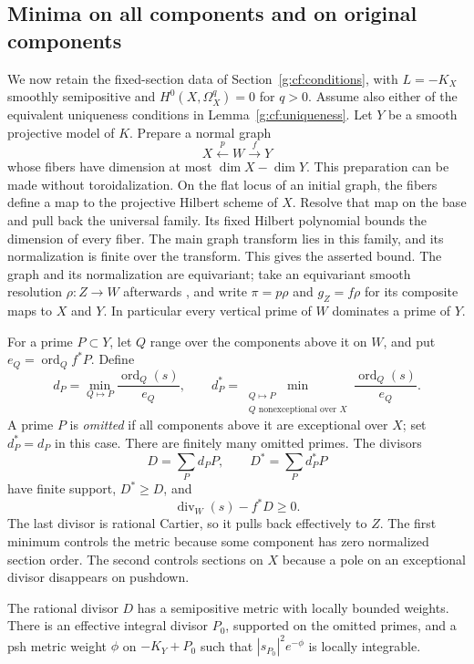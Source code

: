 \subsection{Minima on all components and on original components}
\label{g:cf:minima}

We now retain the fixed-section data of
Section~\ref{g:cf:conditions}, with $L=-K_X$ smoothly semipositive and
$H^0(X,\Omega_X^q)=0$ for $q>0$. Assume also either of the equivalent
uniqueness conditions in Lemma~\ref{g:cf:uniqueness}. Let $Y$ be a smooth projective model
of $K$. Prepare a normal graph
\[
 X\xleftarrow{p}W\xrightarrow{f}Y
\]
whose fibers have dimension at most $\dim X-\dim Y$.
This preparation can be made without toroidalization. On the flat locus
of an initial graph, the fibers define a map to the projective Hilbert
scheme of $X$. Resolve that map on the base and pull back the universal
family. Its fixed Hilbert polynomial bounds the dimension of every fiber.
The main graph transform lies in this family, and its normalization is
finite over the transform. This gives the asserted bound. The graph and
its normalization are equivariant; take an equivariant
smooth resolution $\rho:Z\to W$ afterwards
\cite{RaynaudGruson1971}, and write $\pi=p\rho$ and $g_Z=f\rho$ for
its composite maps to $X$ and $Y$. In particular every vertical
prime of $W$ dominates a prime of $Y$.

For a prime $P\subset Y$, let $Q$ range over the components above it on
$W$, and put $e_Q=\operatorname{ord}_Q f^*P$. Define
\[
 d_P=\min_{Q\mapsto P}\frac{\operatorname{ord}_Q(s)}{e_Q},\qquad
 d_P^*=\min_{\substack{Q\mapsto P\\Q\text{ nonexceptional over }X}}
                       \frac{\operatorname{ord}_Q(s)}{e_Q}.
\]
A prime $P$ is \emph{omitted} if all components above it are exceptional
over $X$; set $d_P^*=d_P$ in this case. There are finitely many omitted
primes. The divisors
\[
 D=\sum_Pd_PP,\qquad D^*=\sum_Pd_P^*P
\]
have finite support, $D^*\geq D$, and
\[
 \operatorname{div}_W(s)-f^*D\geq0.
\]
The last divisor is rational Cartier, so it pulls back effectively to
$Z$. The first minimum controls the metric because some component has
zero normalized section order. The second controls sections on $X$
because a pole on an exceptional divisor disappears on pushdown.

\begin{lemma}\label{g:cf:finite-volume-base}
The rational divisor $D$ has a semipositive metric with locally bounded
weights. There is an effective integral divisor $P_0$, supported on the
omitted primes, and a psh metric weight $\phi$ on $-K_Y+P_0$ such that
$|s_{P_0}|^2e^{-\phi}$ is locally integrable.
\end{lemma}

